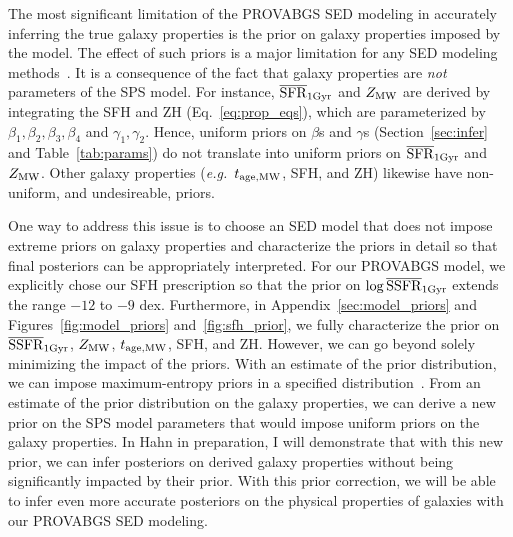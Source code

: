 The most significant limitation of the {\sc PROVABGS} SED modeling in
accurately inferring the true galaxy properties is the prior on galaxy
properties imposed by the model. 
The effect of such priors is  a major limitation for any SED modeling
methods~\citep{carnall2017, leja2019}. 
It is a consequence of the fact that galaxy properties are \emph{not}
parameters of the SPS model.
For instance, $\overline{\rm SFR}_{\rm 1Gyr}$ and $Z_{\rm MW}$ are derived by integrating the SFH and ZH
(Eq.~\ref{eq:prop_eqs}), which are parameterized by $\beta_1, \beta_2, \beta_3,
\beta_4$ and $\gamma_1, \gamma_2$. 
Hence, uniform priors on $\beta$s and $\gamma$s (Section~\ref{sec:infer} and
Table~\ref{tab:params}) do not translate into uniform priors on $\overline{\rm SFR}_{\rm 1Gyr}$ and
$Z_{\rm MW}$.
Other galaxy properties (\emph{e.g.}~$t_{\rm age, MW}$, SFH, and ZH) likewise have
non-uniform, and undesireable, priors. 

One way to address this issue  is to choose an SED model that does not impose
extreme priors on galaxy properties and characterize the priors in detail so
that final posteriors can be appropriately  interpreted. 
For our {\sc PROVABGS} model, we explicitly chose our SFH prescription so that
the prior on $\log\overline{\rm SSFR}_{\rm 1Gyr}$ extends the range $-12$ to $-9$ dex.
Furthermore, in Appendix~\ref{sec:model_priors} and
Figures~\ref{fig:model_priors} and~\ref{fig:sfh_prior}, we fully characterize
the prior on $\overline{\rm SSFR}_{\rm 1Gyr}$, $Z_{\rm MW}$, $t_{\rm age, MW}$, SFH, and ZH.
However, we can go beyond solely minimizing the impact of the priors. 
With an estimate of the prior distribution, we can impose maximum-entropy
priors in a specified distribution~\citep{handley2019}. 
From an estimate of the prior distribution on the galaxy properties, we can
derive a new prior on the SPS model parameters that would impose uniform priors
on the galaxy properties. 
In Hahn in preparation, I will demonstrate that with this new prior, we can
infer posteriors on derived galaxy properties without being significantly
impacted by their prior. 
With this prior correction, we will be able to infer even more accurate
posteriors on the physical properties of galaxies with our {\sc PROVABGS} SED
modeling.

